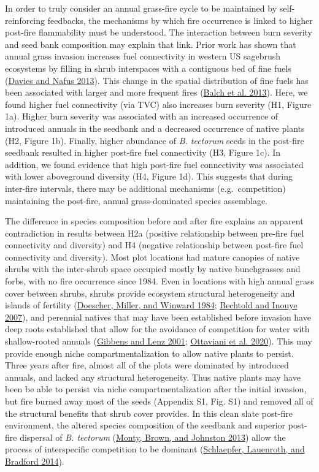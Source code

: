 \documentclass[
  12pt,
]{article}
\begin{document}
In order to truly consider an annual grass-fire cycle to be maintained
by self-reinforcing feedbacks, the mechanisms by which fire occurrence
is linked to higher post-fire flammability must be understood. The
interaction between burn severity and seed bank composition may explain
that link. Prior work has shown that annual grass invasion increases
fuel connectivity in western US sagebrush ecosystems by filling in shrub
interspaces with a contiguous bed of fine fuels
(\protect\hyperlink{ref-Davies2013}{Davies and Nafus 2013}). This change
in the spatial distribution of fine fuels has been associated with
larger and more frequent fires (\protect\hyperlink{ref-Balch2013}{Balch
et al. 2013}). Here, we found higher fuel connectivity (via TVC) also
increases burn severity (H1, Figure 1a). Higher burn severity was
associated with an increased occurrence of introduced annuals in the
seedbank and a decreased occurrence of native plants (H2, Figure 1b).
Finally, higher abundance of \emph{B. tectorum} seeds in the post-fire
seedbank resulted in higher post-fire fuel connectivity (H3, Figure 1c).
In addition, we found evidence that high post-fire fuel connectivity was
associated with lower aboveground diversity (H4, Figure 1d). This
suggests that during inter-fire intervals, there may be additional
mechanisms (e.g.~competition) maintaining the post-fire, annual
grass-dominated species assemblage.

The difference in species composition before and after fire explains an
apparent contradiction in results between H2a (positive relationship
between pre-fire fuel connectivity and diversity) and H4 (negative
relationship between post-fire fuel connectivity and diversity). Most
plot locations had mature canopies of native shrubs with the inter-shrub
space occupied mostly by native bunchgrasses and forbs, with no fire
occurrence since 1984. Even in locations with high annual grass cover
between shrubs, shrubs provide ecosystem structural heterogeneity and
islands of fertility (\protect\hyperlink{ref-Doescher1984}{Doescher,
Miller, and Winward 1984}; \protect\hyperlink{ref-Bechtold2007}{Bechtold
and Inouye 2007}), and perennial natives that may have been established
before invasion have deep roots established that allow for the avoidance
of competition for water with shallow-rooted annuals
(\protect\hyperlink{ref-Gibbens2001}{Gibbens and Lenz 2001};
\protect\hyperlink{ref-Ottaviani2020}{Ottaviani et al. 2020}). This may
provide enough niche compartmentalization to allow native plants to
persist. Three years after fire, almost all of the plots were dominated
by introduced annuals, and lacked any structural heterogeneity. Thus
native plants may have been be able to persist via niche
compartmentalization after the initial invasion, but fire burned away
most of the seeds (Appendix S1, Fig. S1) and removed all of the
structural benefits that shrub cover provides. In this clean slate
post-fire environment, the altered species composition of the seedbank
and superior post-fire dispersal of \emph{B. tectorum}
(\protect\hyperlink{ref-Monty2013}{Monty, Brown, and Johnston 2013})
allow the process of interspecific competition to be dominant
(\protect\hyperlink{ref-Schlaepfer2014}{Schlaepfer, Lauenroth, and
Bradford 2014}).
\end{document}
